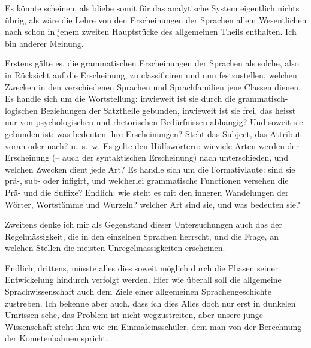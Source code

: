 Es könnte scheinen, als bliebe somit für das analytische System eigentlich nichts übrig, als wäre die Lehre von den Erscheinungen der Sprachen allem Wesentlichen nach schon in jenem zweiten Hauptstücke des allgemeinen Theils enthalten. Ich bin anderer Meinung.

Erstens gälte es, die grammatischen Erscheinungen der Sprachen als solche, also in Rücksicht auf die Erscheinung, zu classificiren und nun festzustellen, welchen Zwecken in den verschiedenen Sprachen und Sprachfamilien jene Classen dienen. Es handle sich um die Wortstellung: inwieweit ist sie durch die gramm\-atisch-logischen Beziehungen der Satztheile gebunden, inwieweit ist sie frei, das heisst nur von psychologischen und rhetorischen Bedürfnissen abhängig? Und soweit sie gebunden ist: was bedeuten ihre Erscheinungen? Steht das Subject, das Attribut voran oder nach? u.~s.~w. Es gelte den Hülfswörtern: wieviele Arten werden der Erscheinung (– auch der syntaktischen Erscheinung) nach unterschieden, und welchen Zwecken dient jede Art? Es handle sich um die Formativlaute: sind sie prä-, sub- oder infigirt, und welcherlei grammatische Functionen versehen die Prä- und die Suffixe? Endlich: wie steht es mit den inneren Wandelungen der Wörter, Wortstämme und Wurzeln? welcher Art sind sie, und was bedeuten sie?

\label{sp.481}

Zweitens denke ich mir als Gegenstand dieser Untersuchungen auch das  der Regelmässigkeit, die in den einzelnen Sprachen herrscht, und die Frage, an welchen Stellen die meisten Unregelmässigkeiten erscheinen.

Endlich, drittens, müsste alles dies soweit möglich durch die Phasen seiner Entwickelung hindurch verfolgt werden. Hier wie überall soll die allgemeine Sprachwissenschaft auch dem Ziele einer allgemeinen Sprachengeschichte zustreben. Ich bekenne aber auch, dass ich dies Alles doch \label{fp.462} nur erst in dunkelen Umrissen sehe, das Problem ist nicht wegzustreiten, aber unsere junge Wissenschaft steht ihm  wie ein Einmaleinsschüler, dem man von der Berechnung der Kometenbahnen spricht.


